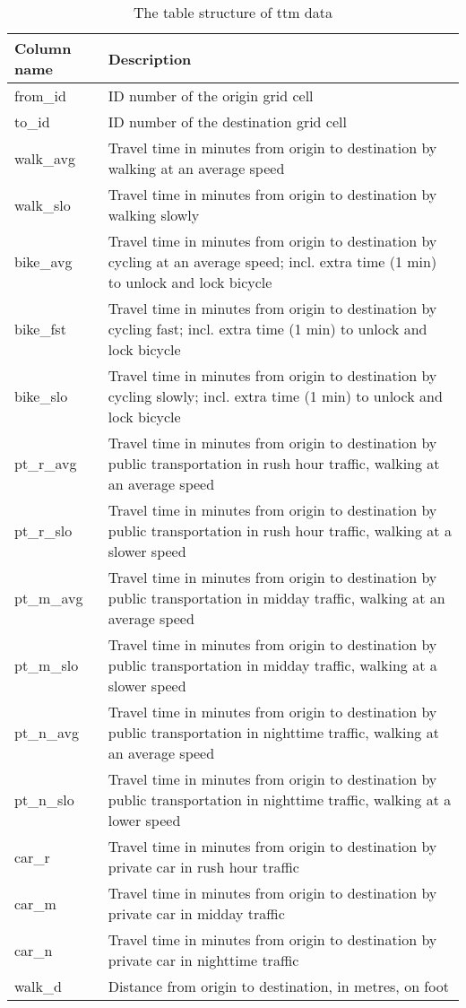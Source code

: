 \begin{table}[H]
	\caption{The table structure of \acrshort{ttm} data}
	\label{tab:ttm table structure}
	\centering
	\begin{tabular}{ | L{0.15\textwidth} | L{0.75\textwidth} | }
		\hline
		Column name
		& Description
		\\
		\hline
		\hline
		from\_id
		& ID number of the origin grid cell
		\\
		\hline
		to\_id
		& ID number of the destination grid cell
		\\
		\hline
		walk\_avg
		& Travel time in minutes from origin to destination by walking at an average speed
		\\
		\hline
		walk\_slo
		& Travel time in minutes from origin to destination by walking slowly
		\\
		\hline
		bike\_avg
		& Travel time in minutes from origin to destination by cycling at an average speed; incl. extra time (1 min) to unlock and lock bicycle
		\\
		\hline
		bike\_fst
		& Travel time in minutes from origin to destination by cycling fast; incl. extra time (1 min) to unlock and lock bicycle
		\\
		\hline
		bike\_slo
		& Travel time in minutes from origin to destination by cycling slowly; incl. extra time (1 min) to unlock and lock bicycle
		\\
		\hline
		pt\_r\_avg
		& Travel time in minutes from origin to destination by public transportation in rush hour traffic, walking at an average speed
		\\
		\hline
		pt\_r\_slo
		& Travel time in minutes from origin to destination by public transportation in rush hour traffic, walking at a slower speed
		\\
		\hline
		pt\_m\_avg
		& Travel time in minutes from origin to destination by public transportation in midday traffic, walking at an average speed
		\\
		\hline
		pt\_m\_slo
		& Travel time in minutes from origin to destination by public transportation in midday traffic, walking at a slower speed
		\\
		\hline
		pt\_n\_avg
		& Travel time in minutes from origin to destination by public transportation in nighttime traffic, walking at an average speed
		\\
		\hline
		pt\_n\_slo
		& Travel time in minutes from origin to destination by public transportation in nighttime traffic, walking at a lower speed
		\\
		\hline
		car\_r
		& Travel time in minutes from origin to destination by private car in rush hour traffic
		\\
		\hline
		car\_m
		& Travel time in minutes from origin to destination by private car in midday traffic
		\\
		\hline
		car\_n
		& Travel time in minutes from origin to destination by private car in nighttime traffic
		\\
		\hline
		walk\_d
		& Distance from origin to destination, in metres, on foot
		\\
		\hline
	\end{tabular}
\end{table}
